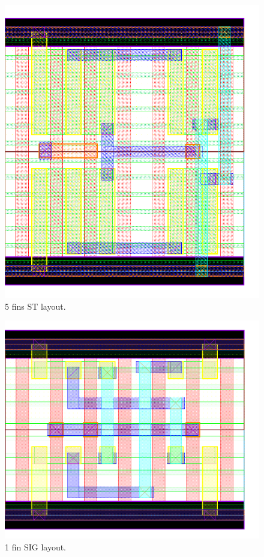 \documentclass[pgmicro,mestrado,english]{iiufrgs}
\begin{document}
\begin{figure}[H]
\centering
\includegraphics[width=\textwidth,height=\textheight,keepaspectratio]{ST5F.png}
\caption{5 fins ST layout.}
\label{fig:ST5F}
\end{figure}






\begin{figure}[H]
\centering
\includegraphics[width=\textwidth,height=\textheight,keepaspectratio]{SIG1F.png}
\caption{1 fin SIG layout.}
\label{fig:SIG1F}
\end{figure}
\end{document}
